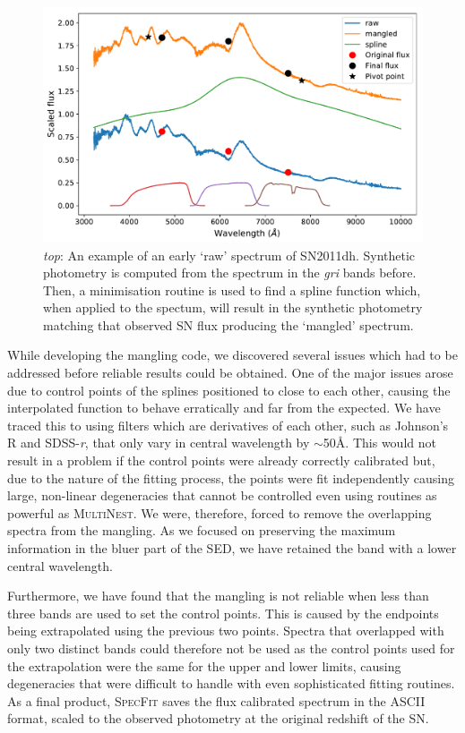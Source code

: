 \begin{figure}
  \centering
  \includegraphics[width=\textwidth]{Figures/Chapter4/Mangling}
  \caption{\textit{top}: An example of an early `raw' spectrum of SN2011dh. Synthetic photometry is computed from the spectrum in the \textit{gri} bands before. Then, a minimisation routine is used to find a spline function which, when applied to the spectum, will result in the synthetic photometry matching that observed SN flux producing the `mangled' spectrum.}
  \label{fig:SpecMangling}
\end{figure}

While developing the mangling code, we discovered several issues which had to be addressed before reliable results could be obtained. One of the major issues arose due to control points of the splines positioned to close to each other, causing the interpolated function to behave erratically and far from the expected. We have traced this to using filters which are derivatives of each other, such as Johnson's R and SDSS-\textit{r}, that only vary in central wavelength by $\sim$50\AA. This would not result in a problem if the control points were already correctly calibrated but, due to the nature of the fitting process, the points were fit independently causing large, non-linear degeneracies that cannot be controlled even using routines as powerful as \textsc{MultiNest}. We were, therefore, forced to remove the overlapping spectra from the mangling. As we focused on preserving the maximum information in the bluer part of the SED, we have retained the band with a lower central wavelength.

Furthermore, we have found that the mangling is not reliable when less than three bands are used to set the control points. This is caused by the endpoints being extrapolated using the previous two points. Spectra that overlapped with only two distinct bands could therefore not be used as the control points used for the extrapolation were the same for the upper and lower limits, causing degeneracies that were difficult to handle with even sophisticated fitting routines. As a final product, \textsc{SpecFit} saves the flux calibrated spectrum in the ASCII format, scaled to the observed photometry at the original redshift of the SN.

